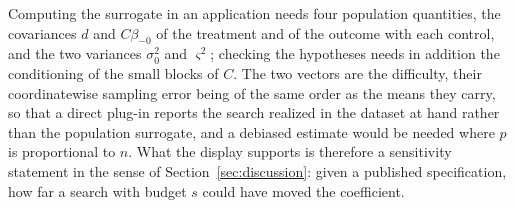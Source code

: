 Computing the surrogate in an application needs four population
quantities, the covariances $d$ and $C\beta_{-0}$ of the treatment and of
the outcome with each control, and the two variances $\sigma_0^2$ and
$\varsigma^2$; checking the hypotheses needs in addition the conditioning
of the small blocks of $C$. The two vectors are the difficulty, their
coordinatewise sampling error being of the same order as the means they
carry, so that a direct plug-in reports the search realized in the
dataset at hand rather than the population surrogate, and a debiased
estimate would be needed where $p$ is proportional to $n$. What the
display supports is therefore a sensitivity statement in the sense of
Section~\ref{sec:discussion}: given a published specification, how far a
search with budget $s$ could have moved the coefficient.



